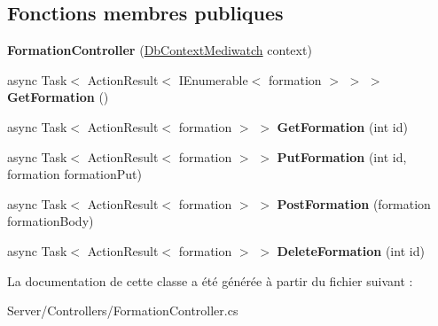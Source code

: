 \subsection*{Fonctions membres publiques}
\begin{DoxyCompactItemize}
\item 
\mbox{\label{class_mediwatch_1_1_server_1_1_controllers_1_1_formation_controller_a71430327b82736d6b252d83a40833dbd}} 
{\bfseries Formation\+Controller} (\hyperlink{class_server_1_1_db_context_mediwatch}{Db\+Context\+Mediwatch} context)
\item 
\mbox{\label{class_mediwatch_1_1_server_1_1_controllers_1_1_formation_controller_ac1711d7a1c8bbd44715fc57cb945c93c}} 
async Task$<$ Action\+Result$<$ I\+Enumerable$<$ formation $>$ $>$ $>$ {\bfseries Get\+Formation} ()
\item 
\mbox{\label{class_mediwatch_1_1_server_1_1_controllers_1_1_formation_controller_aecf887fc57ba8ee1af0ba1be7703738a}} 
async Task$<$ Action\+Result$<$ formation $>$ $>$ {\bfseries Get\+Formation} (int id)
\item 
\mbox{\label{class_mediwatch_1_1_server_1_1_controllers_1_1_formation_controller_ac56853c9a6cf3b7cb2303d1c6bf8a037}} 
async Task$<$ Action\+Result$<$ formation $>$ $>$ {\bfseries Put\+Formation} (int id, formation formation\+Put)
\item 
\mbox{\label{class_mediwatch_1_1_server_1_1_controllers_1_1_formation_controller_a2710e701c2d495ee6a1d343a5303bfa3}} 
async Task$<$ Action\+Result$<$ formation $>$ $>$ {\bfseries Post\+Formation} (formation formation\+Body)
\item 
\mbox{\label{class_mediwatch_1_1_server_1_1_controllers_1_1_formation_controller_af3e300009a2f7d0d1551da387effbe09}} 
async Task$<$ Action\+Result$<$ formation $>$ $>$ {\bfseries Delete\+Formation} (int id)
\end{DoxyCompactItemize}


La documentation de cette classe a été générée à partir du fichier suivant \+:\begin{DoxyCompactItemize}
\item 
Server/\+Controllers/Formation\+Controller.\+cs\end{DoxyCompactItemize}
